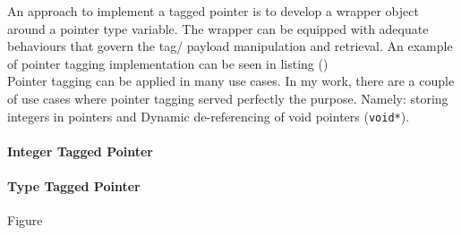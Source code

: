 An approach to implement a tagged pointer is to develop a wrapper object around a pointer type variable. The wrapper can be equipped with adequate behaviours that govern the tag/ payload manipulation and retrieval. An example of pointer tagging implementation can be seen in listing () \\
 
Pointer tagging can be applied in many use cases. In my work, there are a couple of use cases where pointer tagging served perfectly the purpose. Namely: storing integers in pointers and Dynamic de-referencing of void pointers (\texttt{void*}). 					

\paragraph{Integer Tagged Pointer}

\paragraph{Type Tagged Pointer} 
Figure